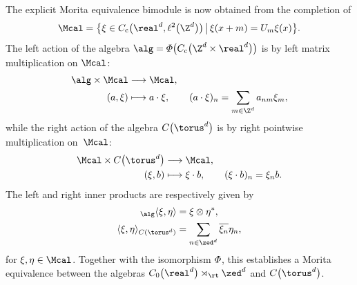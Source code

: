\begin{Example}[tori]
The explicit Morita equivalence bimodule is now obtained from the
completion of
\[
\Mcal = \big\{\xi\in C_{\rm c}\big(\real^d,\ell^2\big(\Z^d\big)\big) \, \big| \, \xi(x+m) =
U_m \xi(x) \big\} .
\]
The left action of the algebra $\alg={\mit\Phi}\big(C_{\rm c}\big(\Z^d\times\real^d\big)\big)$ is by left
matrix multiplication on $\Mcal$:
\begin{align*}
\alg\times\Mcal &\longrightarrow\Mcal , \\
(a,\xi) & \longmapsto a\cdot\xi , \qquad (a\cdot\xi)_n=\sum_{m\in\Z^d}
a_{nm} \xi_m ,
\end{align*}
while the right action of the algebra $C\big(\torus^d\big)$ is by right pointwise
multiplication on~$\Mcal$:
\begin{align*}
\Mcal\times C\big(\torus^d\big) & \longrightarrow\Mcal , \nonumber \\
(\xi,b) & \longmapsto \xi\cdot b , \qquad (\xi\cdot b)_n=\xi_n b .
\end{align*}
The left and right inner
products are respectively given by
\begin{gather*}
{}_\alg\langle\xi,\eta\rangle = \xi\otimes\eta^* , \\
\langle\xi,\eta\rangle_{C(\torus^d)} = \sum_{n\in\zed^d}
\overline{\xi_n} \eta_n ,
\end{gather*}
for $\xi,\eta\in\Mcal$.
Together with the isomorphism $\mit\Phi$, this establishes a
Morita equivalence between the algebras $C_0\big(\real^d\big)\rtimes_\rt\zed^d$
and $C\big(\torus^d\big)$.
\end{Example}
